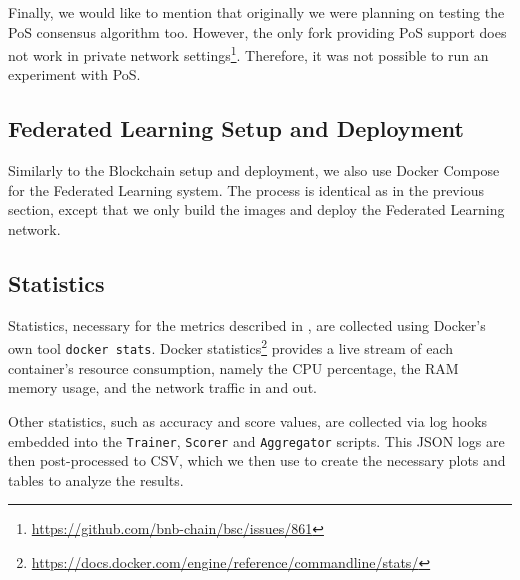 Finally, we would like to mention that originally we were planning on testing the PoS consensus algorithm too. However, the only fork providing PoS support does not work in private network settings\footnote{\url{https://github.com/bnb-chain/bsc/issues/861}}. Therefore, it was not possible to run an experiment with PoS.

\subsection{Federated Learning Setup and Deployment}

Similarly to the Blockchain setup and deployment, we also use Docker Compose for the Federated Learning system. The process is identical as in the previous section, except that we only build the images and deploy the Federated Learning network.

\subsection{Statistics}

Statistics, necessary for the metrics described in , are collected using Docker's own tool \texttt{docker stats}. Docker statistics\footnote{\url{https://docs.docker.com/engine/reference/commandline/stats/}} provides a live stream of each container's resource consumption, namely the CPU percentage, the RAM memory usage, and the network traffic in and out.

Other statistics, such as accuracy and score values, are collected via log hooks embedded into the \texttt{Trainer}, \texttt{Scorer} and \texttt{Aggregator} scripts. This JSON logs are then post-processed to CSV, which we then use to create the necessary plots and tables to analyze the results.
